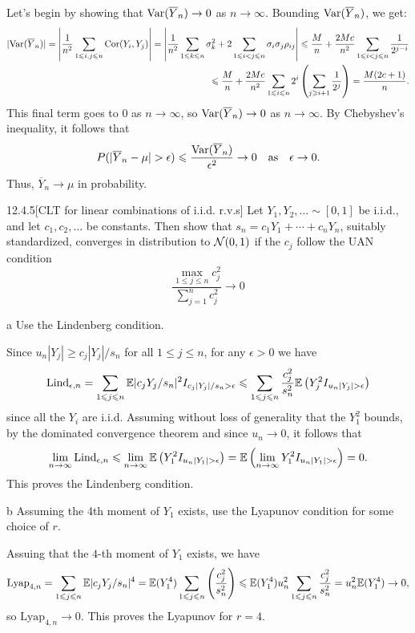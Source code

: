\documentclass{pset}
\begin{document}
\begin{solution}
  Let's begin by showing that $\textrm{Var}(\overline{Y}_n)\to 0$ as $n\to \infty$. Bounding $\textrm{Var}(\overline{Y}_n)$, we get:
  \[
    \begin{aligned}
      |\textrm{Var}(\overline{Y}_n)| = \left|\frac{1}{n^2}\sum_{1\leqslant i,j\leqslant n}\textrm{Cor}(Y_i, Y_j)\right| = \left|\frac{1}{n^2}\sum_{1\leqslant k\leqslant n}\sigma_k^2 
      + 2\sum_{1\leqslant i<j\leqslant n}\sigma_i\sigma_j\rho_{ij}\right| 
      \leqslant \frac{M}{n} + \frac{2Mc}{n^2}\sum_{1\leqslant i<j\leqslant n}\frac{1}{2^{j-i}}\\
      \leqslant \frac{M}{n}+\frac{2Mc}{n^2}\sum_{1\leqslant i\leqslant n}2^i\left(\sum_{j\geqslant i+1}\frac{1}{2^j}\right)= \frac{M(2c+1)}{n}.
    \end{aligned}
  \]
  This final term goes to $0$ as $n\to \infty$, so $\textrm{Var}(\overline{Y}_n)\to 0$ as $n\to \infty$. By Chebyshev's inequality, it follows that
  \[
    P(|\overline{Y}_n-\mu| > \epsilon) \leqslant \frac{\textrm{Var}(\overline{Y}_n)}{\epsilon^2} \to 0\quad\textrm{as}\quad\epsilon \to 0.
  \]
  Thus, $\overline{Y}_n \to \mu$ in probability.
\end{solution}

\begin{problem}{12.4.5}[CLT for linear combinations of i.i.d. r.v.s]
  Let $Y_1, Y_2,\ldots \sim [0,1]$ be i.i.d., and let $c_1, c_2, \ldots$ be constants. Then show that $s_n = c_1Y_1 + \cdots + c_n Y_n$, suitably standardized, converges in distribution to $\mathcal{N}(0,1)$ if the $c_j$ follow the UAN condition
  \[
    \frac{\max_{1\leq j \leq n} c_j^2}{\sum^n_{j=1} c_j^2} \to 0
  \]
\end{problem}

\begin{parts}
  \begin{part}{a}
    Use the Lindenberg condition.
  \end{part}

  Since $u_n|Y_j| \geq c_j |Y_j|/s_n$ for all $1\leq j\leq n$, for any $\epsilon>0$ we have
  \[
    \textrm{Lind}_{\epsilon, n} = \sum_{1\leq j\leq n} \E|c_j Y_j / s_n|^2 I_{c_j|Y_j|/s_n > \epsilon} \leq \sum_{1\leq j \leq n} \frac{c_j^2}{s_n^2}\E\left(Y_j^2 I_{u_n|Y_j|>\epsilon}\right)
  \]
  since all the $Y_i$ are i.i.d. Assuming without loss of generality that the $Y_1^2$ bounds, by the dominated convergence theorem and since $u_n\to 0$, it follows that 
  \[
    \lim_{n\to \infty} \textrm{Lind}_{\epsilon, n} \leqslant \lim_{n\to \infty} \mathbb{E}\left(Y_1^2 I_{u_n|Y_1| > \epsilon}\right) = \mathbb{E}\left(\lim_{n\to \infty} Y_1^2 I_{u_n |Y_1| > \epsilon}\right) = 0.
  \]
  This proves the Lindenberg condition.

  \begin{part}{b}
    Assuming the 4th moment of $Y_1$ exists, use the Lyapunov condition for some choice of $r$.
  \end{part}

  Assuing that the $4$-th moment of $Y_1$ exists, we have
  \[
    \textrm{Lyap}_{4,n} = \sum_{1\leqslant j\leqslant n} \mathbb{E}|c_jY_j/s_n|^4 = \mathbb{E}(Y_1^4)\sum_{1\leqslant j\leqslant n}\left(\frac{c_j^2}{s_n^2}\right) \leqslant \mathbb{E}(Y_1^4) u_n^2\sum_{1\leqslant j\leqslant n} \frac{c_j^2}{s_n^2} = u_n^2\mathbb{E}(Y_1^4) \to 0,
  \]
  so $\textrm{Lyap}_{4,n}\to 0$. This proves the Lyapunov for $r=4$.
\end{parts}
\end{document}
